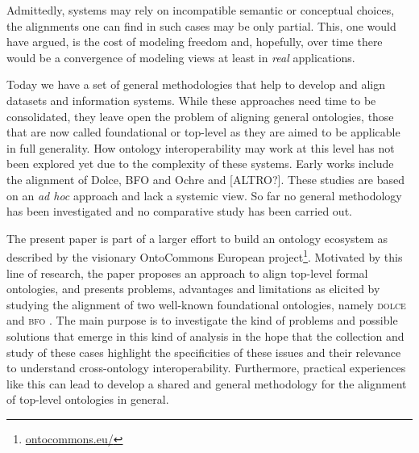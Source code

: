 \documentclass[ao]{iosart2x}
\newcommand{\dolce}{{\textsc{dolce}}}
\newcommand{\bfo}{{\textsc{bfo}}}
\begin{document}
Admittedly, systems may rely on incompatible semantic or conceptual choices, the alignments one can find in such cases may be only partial. This, one would have argued, is the cost of modeling freedom and, hopefully, over time there would be a convergence of modeling views at least in {\em real} applications.

Today we have a set of general methodologies \cite{Euzenat2013, Jarrar2009, fernandezMethontology1997, gomezNeon2009} that help to develop and align datasets and information systems. While these approaches need time to be consolidated, they leave open the problem of aligning general ontologies, those that are now called foundational or top-level as they are aimed to be applicable in full generality. 
How ontology interoperability may work at this level has not been explored yet due to the complexity of these systems. Early works include the alignment of Dolce, BFO and Ochre \citep{D18} and [ALTRO?]. These studies are based on an \textit{ad hoc} approach and lack a systemic view. So far no general methodology has been investigated and no comparative study has been carried out.

\medskip
The present paper is part of a larger effort to build an ontology ecosystem as described by the visionary OntoCommons European project\footnote{\url{ontocommons.eu/}}. Motivated by this line of research, the paper proposes an approach to align top-level formal ontologies, and presents problems, advantages and limitations as elicited by studying the alignment of two well-known foundational ontologies, namely {\dolce} \citep{borgoDOLCEDescriptiveOntology2022} and {\bfo} \cite{barryBasicFormalOntology2015}. The main purpose is to investigate the kind of problems and possible solutions that emerge in this kind of analysis in the hope that the collection and study of these cases highlight the specificities of these issues and their relevance to understand cross-ontology interoperability. Furthermore, practical experiences like this can lead to develop a shared and general methodology for the alignment of top-level ontologies in general.
\end{document}
